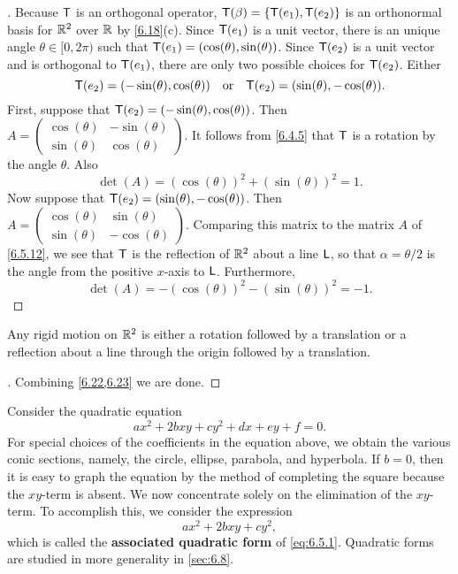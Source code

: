 \begin{proof}[]
  Because \(\mathsf{T}\) is an orthogonal operator, \(\mathsf{T}(\beta) = \left\lbrace\mathsf{T}(e_1), \mathsf{T}(e_2)\right\rbrace\) is an orthonormal basis for \(\mathbb{R}^2\) over \(\mathbb{R}\) by \cref{6.18}(c).
  Since \(\mathsf{T}(e_1)\) is a unit vector, there is an unique angle \(\theta \in [0, 2 \pi)\) such that \(\mathsf{T}(e_1) = (\cos(\theta), \sin(\theta))\).
  Since \(\mathsf{T}(e_2)\) is a unit vector and is orthogonal to \(\mathsf{T}(e_1)\), there are only two possible choices for \(\mathsf{T}(e_2)\).
  Either
  \[
    \mathsf{T}(e_2) = (-\sin(\theta), \cos(\theta)) \quad \text{or} \quad \mathsf{T}(e_2) = (\sin(\theta), -\cos(\theta)).
  \]
  First, suppose that \(\mathsf{T}(e_2) = (-\sin(\theta), \cos(\theta))\).
  Then \(A = \begin{pmatrix}
    \cos(\theta) & -\sin(\theta) \\
    \sin(\theta) & \cos(\theta)
  \end{pmatrix}\).
  It follows from \cref{6.4.5} that \(\mathsf{T}\) is a rotation by the angle \(\theta\).
  Also
  \[
    \det(A) = (\cos(\theta))^2 + (\sin(\theta))^2 = 1.
  \]
  Now suppose that \(\mathsf{T}(e_2) = (\sin(\theta), -\cos(\theta))\).
  Then \(A = \begin{pmatrix}
    \cos(\theta) & \sin(\theta)  \\
    \sin(\theta) & -\cos(\theta)
  \end{pmatrix}\).
  Comparing this matrix to the matrix \(A\) of \cref{6.5.12}, we see that \(\mathsf{T}\) is the reflection of \(\mathbb{R}^2\) about a line \(\mathsf{L}\), so that \(\alpha = \theta / 2\) is the angle from the positive \(x\)-axis to \(\mathsf{L}\).
  Furthermore,
  \[
    \det(A) = - (\cos(\theta))^2 - (\sin(\theta))^2 = -1.
  \]
\end{proof}

\begin{cor}\label{6.5.17}
  Any rigid motion on \(\mathbb{R}^2\) is either a rotation followed by a translation or a reflection about a line through the origin followed by a translation.
\end{cor}

\begin{proof}[]
  Combining \cref{6.22,6.23} we are done.
\end{proof}

\begin{defn}\label{6.5.18}
  Consider the quadratic equation
  \begin{equation}\label{eq:6.5.1}
    ax^2 + 2bxy + cy^2 + dx + ey + f = 0.
  \end{equation}
  For special choices of the coefficients in the equation above, we obtain the various conic sections, namely, the circle, ellipse, parabola, and hyperbola.
  If \(b = 0\), then it is easy to graph the equation by the method of completing the square because the \(xy\)-term is absent.
  We now concentrate solely on the elimination of the \(xy\)-term.
  To accomplish this, we consider the expression
  \begin{equation}\label{eq:6.5.2}
    ax^2 + 2bxy + cy^2,
  \end{equation}
  which is called the \textbf{associated quadratic form} of \cref{eq:6.5.1}.
  Quadratic forms are studied in more generality in \cref{sec:6.8}.
\end{defn}

